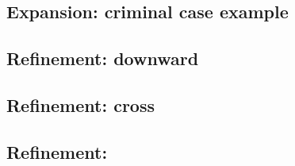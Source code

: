 \documentclass[
  11pt,
  dvipsnames,enabledeprecatedfontcommands]{scrartcl}
\begin{document}
\hypertarget{expansion-criminal-case-example}{%
\subsection{Expansion: criminal case
example}\label{expansion-criminal-case-example}}

\hypertarget{refinement-downward}{%
\subsection{Refinement: downward}\label{refinement-downward}}

\hypertarget{refinement-cross}{%
\subsection{Refinement: cross}\label{refinement-cross}}

\hypertarget{refinement}{%
\subsection{Refinement:}\label{refinement}}
\end{document}
